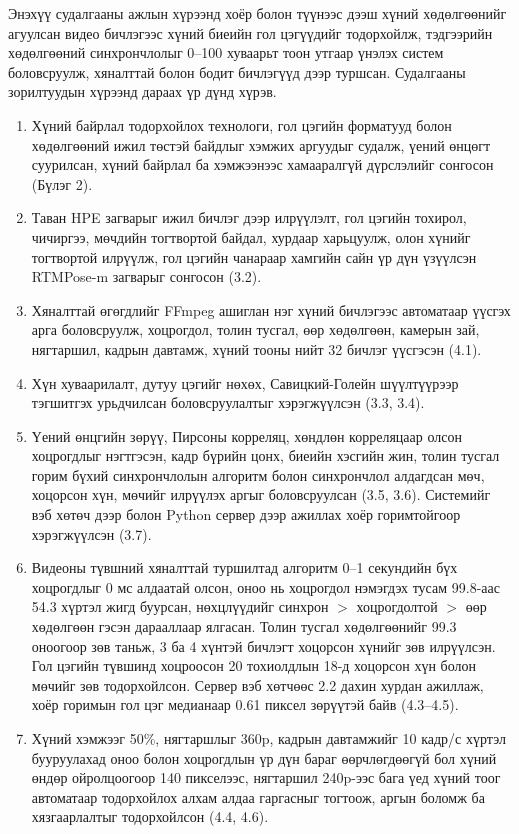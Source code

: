 Энэхүү судалгааны ажлын хүрээнд хоёр болон түүнээс дээш хүний хөдөлгөөнийг агуулсан видео бичлэгээс хүний биеийн гол цэгүүдийг тодорхойлж, тэдгээрийн хөдөлгөөний синхрончлолыг 0--100 хуваарьт тоон утгаар үнэлэх систем боловсруулж, хяналттай болон бодит бичлэгүүд дээр туршсан. Судалгааны зорилтуудын хүрээнд дараах үр дүнд хүрэв.

\begin{enumerate}
\def\labelenumi{\arabic{enumi}.}
\item
  Хүний байрлал тодорхойлох технологи, гол цэгийн форматууд болон хөдөлгөөний ижил төстэй байдлыг хэмжих аргуудыг судалж, үений өнцөгт суурилсан, хүний байрлал ба хэмжээнээс хамааралгүй дүрслэлийг сонгосон (Бүлэг 2).
\item
  Таван HPE загварыг ижил бичлэг дээр илрүүлэлт, гол цэгийн тохирол, чичиргээ, мөчдийн тогтвортой байдал, хурдаар харьцуулж, олон хүнийг тогтвортой илрүүлж, гол цэгийн чанараар хамгийн сайн үр дүн үзүүлсэн RTMPose-m загварыг сонгосон (3.2).
\item
  Хяналттай өгөгдлийг FFmpeg ашиглан нэг хүний бичлэгээс автоматаар үүсгэх арга боловсруулж, хоцрогдол, толин тусгал, өөр хөдөлгөөн, камерын зай, нягтаршил, кадрын давтамж, хүний тооны нийт 32 бичлэг үүсгэсэн (4.1).
\item
  Хүн хуваарилалт, дутуу цэгийг нөхөх, Савицкий-Голейн шүүлтүүрээр тэгшитгэх урьдчилсан боловсруулалтыг хэрэгжүүлсэн (3.3, 3.4).
\item
  Үений өнцгийн зөрүү, Пирсоны корреляц, хөндлөн корреляцаар олсон хоцрогдлыг нэгтгэсэн, кадр бүрийн цонх, биеийн хэсгийн жин, толин тусгал горим бүхий синхрончлолын алгоритм болон синхрончлол алдагдсан мөч, хоцорсон хүн, мөчийг илрүүлэх аргыг боловсруулсан (3.5, 3.6). Системийг вэб хөтөч дээр болон Python сервер дээр ажиллах хоёр горимтойгоор хэрэгжүүлсэн (3.7).
\item
  Видеоны түвшний хяналттай туршилтад алгоритм 0--1 секундийн бүх хоцрогдлыг 0 мс алдаатай олсон, оноо нь хоцрогдол нэмэгдэх тусам 99.8-аас 54.3 хүртэл жигд буурсан, нөхцлүүдийг синхрон \(>\) хоцрогдолтой \(>\) өөр хөдөлгөөн гэсэн дарааллаар ялгасан. Толин тусгал хөдөлгөөнийг 99.3 оноогоор зөв таньж, 3 ба 4 хүнтэй бичлэгт хоцорсон хүнийг зөв илрүүлсэн. Гол цэгийн түвшинд хоцроосон 20 тохиолдлын 18-д хоцорсон хүн болон мөчийг зөв тодорхойлсон. Сервер вэб хөтчөөс 2.2 дахин хурдан ажиллаж, хоёр горимын гол цэг медианаар 0.61 пиксел зөрүүтэй байв (4.3--4.5).
\item
  Хүний хэмжээг 50\%, нягтаршлыг 360p, кадрын давтамжийг 10 кадр/с хүртэл бууруулахад оноо болон хоцрогдлын үр дүн бараг өөрчлөгдөөгүй бол хүний өндөр ойролцоогоор 140 пикселээс, нягтаршил 240p-ээс бага үед хүний тоог автоматаар тодорхойлох алхам алдаа гаргасныг тогтоож, аргын боломж ба хязгаарлалтыг тодорхойлсон (4.4, 4.6).
\end{enumerate}

